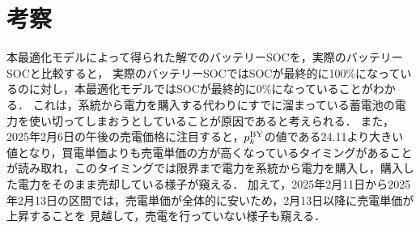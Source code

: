 \documentclass{jarticle}
\begin{document}
\section{考察}
本最適化モデルによって得られた解でのバッテリーSOCを，実際のバッテリーSOCと比較すると，
実際のバッテリーSOCではSOCが最終的に100\%になっているのに対し，本最適化モデルではSOCが最終的に0\%になっていることがわかる．
これは，系統から電力を購入する代わりにすでに溜まっている蓄電池の電力を使い切ってしまおうとしていることが原因であると考えられる．
また，2025年2月6日の午後の売電価格に注目すると，$p^{\rm BY}_k$の値である24.11より大きい値となり，買電単価よりも売電単価の方が高くなっているタイミングがあることが読み取れ，このタイミングでは限界まで電力を系統から電力を購入し，購入した電力をそのまま売却している様子が窺える．
加えて，2025年2月11日から2025年2月13日の区間では，売電単価が全体的に安いため，2月13日以降に売電単価が上昇することを
見越して，売電を行っていない様子も窺える．
\end{document}
